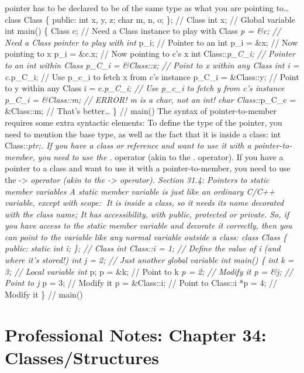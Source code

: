 pointer has to be declared to be of the same type as what you are
pointing to\ldots{} class Class \{ public: int x, y, z; char m, n, o;
\}; // Class int x; // Global variable int main() \{ Class c; // Need a
Class instance to play with Class \emph{p = \&c; // Need a Class pointer
to play with int }p\_i; // Pointer to an int p\_i = \&x; // Now pointing
to x p\_i = \&c.x; // Now pointing to c's x int Class::\emph{p\_C\_i; //
Pointer to an int within Class p\_C\_i = \&Class::x; // Point to x
within any Class int i = c.}p\_C\_i; // Use p\_c\_i to fetch x from c's
instance p\_C\_i = \&Class::y; // Point to y within any Class i =
c.\emph{p\_C\_i; // Use p\_c\_i to fetch y from c's instance p\_C\_i =
\&Class::m; // ERROR! m is a char, not an int! char Class::}p\_C\_c =
\&Class::m; // That's better\ldots{} \} // main() The syntax of
pointer-to-member requires some extra syntactic elements: To deﬁne the
type of the pointer, you need to mention the base type, as well as the
fact that it is inside a class: int Class::\emph{ptr;. If you have a
class or reference and want to use it with a pointer-to-member, you need
to use the .} operator (akin to the . operator). If you have a pointer
to a class and want to use it with a pointer-to-member, you need to use
the -\textgreater{}\emph{ operator (akin to the -\textgreater{}
operator). Section 31.4: Pointers to static member variables A static
member variable is just like an ordinary C/C++ variable, except with
scope: It is inside a class, so it needs its name decorated with the
class name; It has accessibility, with public, protected or private. So,
if you have access to the static member variable and decorate it
correctly, then you can point to the variable like any normal variable
outside a class: class Class \{ public: static int i; \}; // Class int
Class::i = 1; // Define the value of i (and where it's stored!) int j =
2; // Just another global variable int main() \{ int k = 3; // Local
variable int }p; p = \&k; // Point to k \emph{p = 2; // Modify it p =
\&j; // Point to j }p = 3; // Modify it p = \&Class::i; // Point to
Class::i *p = 4; // Modify it \} // main()

\hypertarget{professional-notes-chapter-34-classesstructures-1}{%
\chapter{Professional Notes: Chapter 34:
Classes/Structures}\label{professional-notes-chapter-34-classesstructures-1}}

